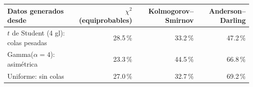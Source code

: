 \begin{tabular}{lrrr}
\toprule
\textbf{Datos generados desde} & \textbf{$\chi^2$ (equiprobables)} & \textbf{Kolmogorov–Smirnov} & \textbf{Anderson–Darling} \\ \midrule
$t$ de Student (4 gl): colas pesadas & 28.5\,\% & 33.2\,\% & 47.2\,\% \\
Gamma($\alpha=4$): asimétrica & 23.3\,\% & 44.5\,\% & 66.8\,\% \\
Uniforme: sin colas & 27.0\,\% & 32.7\,\% & 69.2\,\% \\
\bottomrule
\end{tabular}